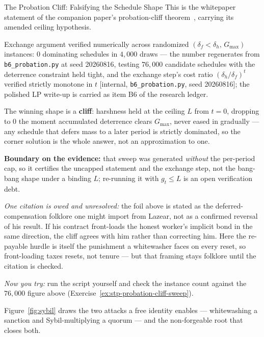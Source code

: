 \documentclass[11pt,a4paper]{article}
\theoremstyle{definition}
\begin{document}
\begin{pdexample}{The Probation Cliff: Falsifying the Schedule Shape}
\setlength{\parskip}{4pt plus 1pt}
This is the whitepaper statement of the companion paper's probation-cliff
theorem~, carrying its amended ceiling hypothesis.

Exchange
argument verified numerically across randomized
$(\delta_f<\delta_h,\,G_{\max})$ instances: $0$ dominating schedules in
$4{,}000$ draws --- the number regenerates from \texttt{b6\_probation.py} at
seed 20260816, testing $76{,}000$ candidate schedules with the deterrence
constraint held tight, and the exchange step's cost ratio
$(\delta_h/\delta_f)^t$ verified strictly monotone in $t$ [internal,
\texttt{b6\_probation.py}, seed 20260816]; the polished LP write-up is
carried as item B6 of the research ledger.

The winning shape is a
\textbf{cliff}: harshness held at the ceiling $L$ from $t=0$, dropping to $0$
the moment accumulated deterrence clears $G_{\max}$, never eased in gradually
--- any schedule that defers mass to a later period is strictly dominated, so
the corner solution is the whole answer, not an approximation to one.

\textbf{Boundary on the evidence:} that sweep was generated
\emph{without} the per-period cap, so it certifies the uncapped statement and
the exchange step, not the bang-bang shape under a binding $L$; re-running it
with $g_t\le L$ is an open verification debt.

\emph{One citation is owed and
unresolved:} the foil above is stated as the deferred-compensation folklore
one might import from Lazear, not as a confirmed reversal of his result. If
his contract front-loads the honest worker's implicit bond in the same
direction, the cliff agrees with him rather than correcting him. Here the re-payable hurdle is itself the
punishment a whitewasher faces on every reset, so front-loading taxes resets,
not tenure --- but that framing stays folklore until the citation is checked.

\emph{Now you try:} run the script yourself and check the instance count
against the $76{,}000$ figure above (Exercise~\ref{ex:stp-probation-cliff-sweep}).
\end{pdexample}

Figure~\ref{fig:sybil} draws the two attacks a free identity enables --- whitewashing
a sanction and Sybil-multiplying a quorum --- and the non-forgeable root that closes
both.

\end{document}
